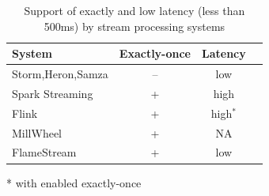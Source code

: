 \begin{table}[htbp]
\begin{threeparttable}
\begin{tabular}{lccl}
System             & Exactly-once & Latency    \\
\hline
Storm,Heron,Samza        &    --   &   low            \\
Spark Streaming    &    +    &   high           \\
Flink              &    +     &    high$^*$       \\
MillWheel          &    +    &   NA             \\
FlameStream        &    +    &   low            \\
\end{tabular}
* with enabled exactly-once~\cite{we2018beyondmr}
\end{threeparttable}
\caption{Support of exactly and low latency (less than 500ms) by stream processing systems}
\label{comparison}
\end{table}